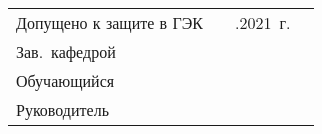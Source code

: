 \begin{flushright}
	\begin{tabular}{lcll}
		Допущено к защите в ГЭК  & 												  & \underline{\hspace{0.7cm}}.\underline{\hspace{0.7cm}}2021~г.	& \\
		Зав.~кафедрой   \hspace{1cm} \underline{\hspace{3.5cm}} 	& \genCafedraRegaliaShort 	& \genCafedraFIOShort 	&	\\
		Обучающийся 	\hspace{0.91cm} \underline{\hspace{3.5cm}} &  						& \thesisAuthorShort 	& 						\\
		Руководитель 	  \hspace{1.08cm} \underline{\hspace{3.5cm}} & \genCafedraRegaliaShort 	& \genCafedraFIOShort 	&						\\
	\end{tabular}
	
\end{flushright}
%
\vspace{0pt plus8fill} %
{\centering\thesisCity~\thesisYear\par}
